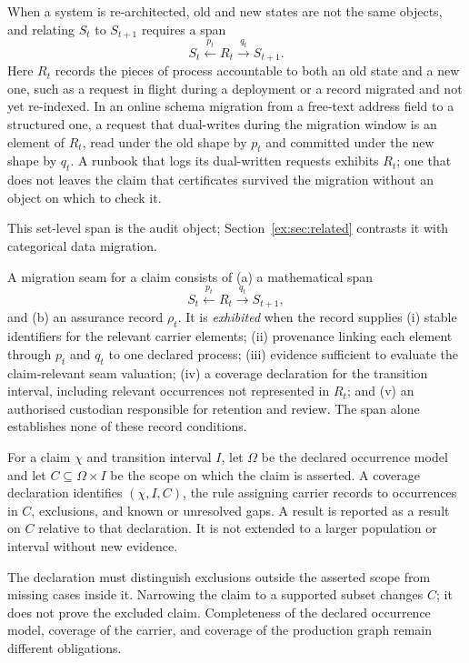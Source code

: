 \documentclass[twocolumn,envcountsect,envcountsame,natbib]{svjour3}
\begin{document}
When a system is re-architected, old and new states are not the same objects, and relating $S_t$ to $S_{t+1}$ requires a span
\[
S_t \xleftarrow{\;p_t\;} R_t \xrightarrow{\;q_t\;} S_{t+1}.
\]
Here $R_t$ records the pieces of process accountable to both an old state and a new one, such as a request in flight during a deployment or a record migrated and not yet re-indexed. In an online schema migration from a free-text address field to a structured one, a request that dual-writes during the migration window is an element of $R_t$, read under the old shape by $p_t$ and committed under the new shape by $q_t$. A runbook that logs its dual-written requests exhibits $R_t$; one that does not leaves the claim that certificates survived the migration without an object on which to check it.

This set-level span is the audit object; Section~\ref{ex:sec:related} contrasts it with categorical data migration.

\begin{definition}\label{ex:def:exhibited-seam}
A migration seam for a claim consists of (a) a mathematical span
\[
S_t\xleftarrow{p_t}R_t\xrightarrow{q_t}S_{t+1},
\]
and (b) an assurance record $\rho_t$. It is \emph{exhibited} when the record supplies (i) stable identifiers for the relevant carrier elements; (ii) provenance linking each element through $p_t$ and $q_t$ to one declared process; (iii) evidence sufficient to evaluate the claim-relevant seam valuation; (iv) a coverage declaration for the transition interval, including relevant occurrences not represented in $R_t$; and (v) an authorised custodian responsible for retention and review. The span alone establishes none of these record conditions.
\end{definition}

\begin{definition}\label{ex:def:coverage}
For a claim $\chi$ and transition interval $I$, let $\Omega$ be the declared occurrence model and let $C\subseteq\Omega\times I$ be the scope on which the claim is asserted. A coverage declaration identifies $(\chi,I,C)$, the rule assigning carrier records to occurrences in $C$, exclusions, and known or unresolved gaps. A result is reported as a result on $C$ relative to that declaration. It is not extended to a larger population or interval without new evidence.
\end{definition}

The declaration must distinguish exclusions outside the asserted scope from missing cases inside it. Narrowing the claim to a supported subset changes $C$; it does not prove the excluded claim. Completeness of the declared occurrence model, coverage of the carrier, and coverage of the production graph remain different obligations.
\end{document}
